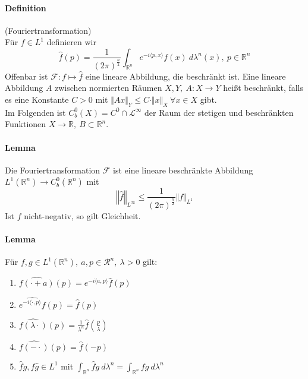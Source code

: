 \documentclass[12pt,a4paper,fleqn]{article}
\begin{document}
\paragraph{Definition} (Fouriertransformation)\\
Für $f \in L^1$ definieren wir
\begin{displaymath}
\widehat{f}(p) = \frac{1}{(2\pi)^{\frac{n}{2}}} \int_{\mathbb{R}^n} e^{-i \langle p, x \rangle} f(x)\ d\lambda^n(x),\ p \in \mathbb{R}^n
\end{displaymath}
Offenbar ist $\mathscr{F}\colon f \mapsto \widehat{f}$ eine lineare Abbildung, die beschränkt ist. Eine lineare Abbildung $A$ zwischen normierten Räumen $X, Y,\ A\colon X \rightarrow Y$ heißt beschränkt, falls es eine Konstante $C>0$ mit $\Vert Ax \Vert_Y \leq C \cdot \Vert x \Vert_X\ \forall x \in X$ gibt. \\
Im Folgenden ist $C^0_b(X) = C^0 \cap \mathscr{L}^\infty$ der Raum der stetigen und beschränkten Funktionen $X \rightarrow \mathbb{R},\ B\subset \mathbb{R}^n$.

\paragraph{Lemma} Die Fouriertransformation $\mathscr{F}$ ist eine lineare beschränkte Abbildung \linebreak\mbox{$L^1(\mathbb{R}^n) \rightarrow C_b^0(\mathbb{R}^n)$} mit
\begin{displaymath}
\left\Vert \widehat{f} \right\Vert_{L^\infty} \leq \frac{1}{(2\pi)^{\frac{n}{2}}} \Vert f \Vert_{L^1}
\end{displaymath}
Ist $f$ nicht-negativ, so gilt Gleichheit.

\paragraph{Lemma} Für $f, g \in L^1(\mathbb{R}^n),\ a, p \in \mathcal{R}^n,\ \lambda >0$ gilt:
\begin{enumerate}
\item$\widehat{f(\cdot + a)}(p) = e^{-i\langle a, p\rangle} \widehat{f}(p)$
\item$\widehat{e^{-i\langle \cdot, p\rangle} f}(p) = \widehat{f}(p)$
\item$\widehat{f(\lambda\cdot)}(p) = \frac{1}{\lambda^n} \widehat{f}(\frac{p}{\lambda})$
\item$\widehat{f(-\cdot)}(p) = \widehat{f}(-p)$
\item$\widehat{f}g, f\widehat{g} \in L^1$ mit $\int_{\mathbb{R}^n} \widehat{f}g\ d\lambda^n = \int_{\mathbb{R}^n} f\widehat{g}\ d\lambda^n$
\end{enumerate}
\end{document}
